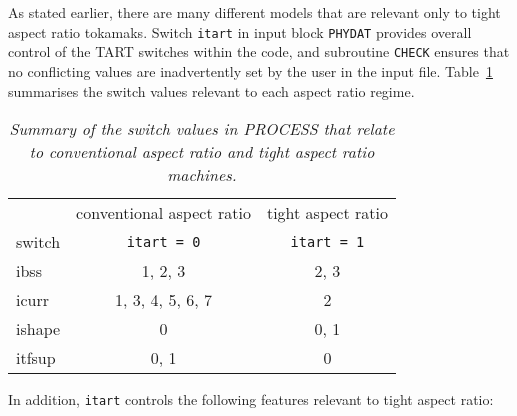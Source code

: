 \documentclass[11pt,a4paper]{report}
\begin{document}
As stated earlier, there are many different models that are relevant only to
tight aspect ratio tokamaks. Switch \texttt{itart} in input block
\texttt{PHYDAT} provides overall control of the TART switches within the code,
and subroutine \texttt{CHECK} ensures that no conflicting values are
inadvertently set by the user in the input file. Table~\ref{tab:tart}
summarises the switch values relevant to each aspect ratio regime.
\begin{table}
\begin{center}
\begin{tabular}{||l|c|c||} \hline
 & conventional aspect ratio & tight aspect ratio \\
switch & \texttt{itart = 0} & \texttt{itart = 1} \\ \hline
ibss & 1, 2, 3 & 2, 3 \\
icurr & 1, 3, 4, 5, 6, 7 & 2 \\
ishape & 0 & 0, 1 \\
itfsup & 0, 1 & 0 \\ \hline
\end{tabular}
\end{center}
\caption{\textit{Summary of the switch values in PROCESS that relate to
conventional aspect ratio and tight aspect ratio machines.}}
\label{tab:tart}
\end{table}
In addition, \texttt{itart} controls the following features relevant to tight
aspect ratio:
\end{document}
